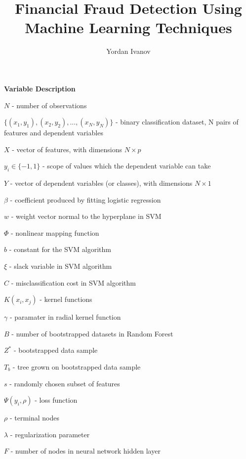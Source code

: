 \documentclass[12pt,]{article}
\title{Financial Fraud Detection Using Machine Learning Techniques}
\author{Yordan Ivanov}
\date{}
\begin{document}
\maketitle

\centering

\raggedright
\clearpage

\tableofcontents
\clearpage

\listoffigures
\clearpage

\listoftables
\clearpage

\textbf{Variable Description}

\(N\) - number of observations

\({\{(x_1,y_1),(x_2,y_2),...,(x_N,y_N)\}}\) - binary classification
dataset, N pairs of features and dependent variables

\(X\) - vector of features, with dimensions \(N\times p\)

\(y_i \in \{-1,1\}\) - scope of values which the dependent variable can
take

\(Y\) - vector of dependent variables (or classes), with dimensions
\(N\times1\)

\(\beta\) - coefficient produced by fitting logistic regression

\(w\) - weight vector normal to the hyperplane in SVM

\(\Phi\) - nonlinear mapping function

\(b\) - constant for the SVM algorithm

\(\xi\) - slack variable in SVM algorithm

\(C\) - misclassification cost in SVM algorithm

\(K(x_i,x_j)\) - kernel functions

\(\gamma\) - paramater in radial kernel function

\(B\) - number of bootstrapped datasets in Random Forest

\(Z^*\) - bootstrapped data sample

\(T_b\) - tree grown on bootstrapped data sample

\(s\) - randomly chosen subset of features

\(\Psi(y_i,\rho)\) - loss function

\(\rho\) - terminal nodes

\(\lambda\) - regularization parameter

\(F\) - number of nodes in neural network hidden layer

\clearpage
\end{document}
